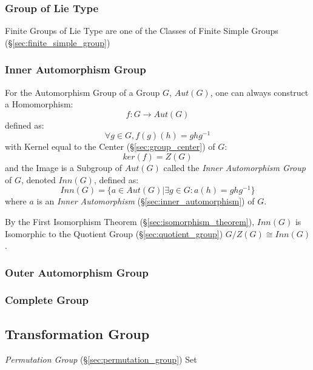 \subsubsection{Group of Lie Type}\label{sec:lie_type_group}

Finite Groups of Lie Type are one of the Classes of Finite Simple Groups
(\S\ref{sec:finite_simple_group})



\subsubsection{Inner Automorphism Group}\label{sec:inner_automorphism_group}

For the Automorphism Group of a Group $G$, $Aut(G)$, one can always
construct a Homomorphism:
\[
    f : G \rightarrow Aut(G)
\]
defined as:
\[
    \forall g \in G, f (g) (h) = g h g^{-1}
\]
with Kernel equal to the Center (\S\ref{sec:group_center}) of $G$:
\[
    ker(f) = Z(G)
\]
and the Image is a Subgroup of $Aut(G)$ called the \emph{Inner
  Automorphism Group} of $G$, denoted $Inn(G)$, defined as:
\[
    Inn(G) = \{ a \in Aut(G) | \exists g \in G : a(h) = g h g^{-1} \}
\]
where $a$ is an \emph{Inner Automorphism}
(\S\ref{sec:inner_automorphism}) of $G$.

By the First Isomorphism Theorem (\S\ref{sec:isomorphism_theorem}),
$Inn(G)$ is Isomorphic to the Quotient Group
(\S\ref{sec:quotient_group}) $G / Z(G) \cong Inn(G)$.



\subsubsection{Outer Automorphism Group}\label{sec:outer_automorphism_group}

\subsubsection{Complete Group}\label{sec:complete_group}



\subsection{Transformation Group}\label{sec:transformation_group}

\emph{Permutation Group} (\S\ref{sec:permutation_group}) Set

